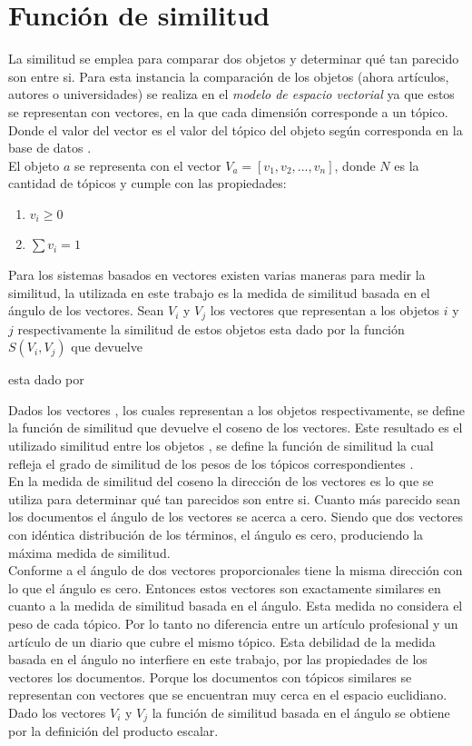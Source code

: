 \section{Función de similitud}
La similitud se emplea para comparar dos objetos y determinar qué tan parecido son entre si. Para esta instancia la comparación de los objetos (ahora artículos, autores o universidades) se realiza en el \textit{modelo de espacio vectorial} ya que estos se representan con vectores, en la que cada dimensión corresponde a un tópico. Donde el valor del vector es el valor del tópico del objeto según corresponda en la base de datos \cite{dataDrive}.\\
El objeto $a$ se representa con el vector $V_a = [v_1,v_2,...,v_n]$, donde $N$ es la cantidad de tópicos y cumple con las propiedades:
\begin{enumerate}
 \item $v_i \geq 0$
 \item $\sum{v_i} = 1$
\end{enumerate}

Para los sistemas basados en vectores existen varias maneras para medir la similitud, la utilizada en este trabajo es la medida de similitud basada en el ángulo de los vectores. Sean $V_i$ y $V_j$ los vectores que representan a los objetos $i$ y $j$ respectivamente la similitud de estos objetos esta dado por la función $S(V_i, V_j)$ que devuelve 

esta dado por 

Dados los vectores , los cuales representan a los objetos respectivamente, se define la función de similitud  que devuelve el coseno de los vectores. Este resultado es el utilizado  similitud entre los objetos , se define la función de similitud  la cual refleja el grado de similitud de los pesos de los tópicos correspondientes .\\
En la medida de similitud del coseno la dirección de los vectores es lo que se utiliza para determinar qué tan parecidos son entre si. Cuanto más parecido sean los documentos el ángulo de los vectores se acerca a cero. Siendo que dos vectores con idéntica distribución de los términos, el ángulo es cero, produciendo la máxima medida de similitud.\\
Conforme a \cite{newSimilarity} el ángulo de dos vectores proporcionales tiene la misma dirección con lo que el ángulo es cero. Entonces estos vectores son exactamente similares en cuanto a la medida de similitud basada en el ángulo. Esta medida no considera el peso de cada tópico. Por lo tanto no diferencia entre un artículo profesional y un artículo de un diario que cubre el mismo tópico. Esta debilidad de la medida basada en el ángulo no interfiere en este trabajo, por las propiedades de los vectores los documentos. Porque los documentos con tópicos similares se representan con vectores que se encuentran muy cerca en el espacio euclidiano. Dado los vectores $V_i$ y $V_j$ la función de similitud basada en el ángulo se obtiene por la definición del producto escalar.\\

